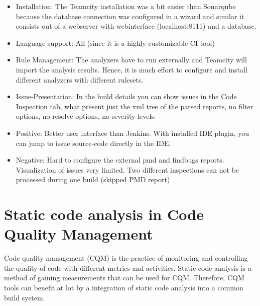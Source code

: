 \documentclass[conference]{IEEEtran}
\begin{document}
\begin{itemize}
	\item Installation: The Teamcity installation was a bit easier than Sonarqube because the database connection was configured in a wizard and similar it consists out of a webserver with webinterface (localhost:8111) and a database.
	
	\item Language support: All (since it is a highly customizable CI tool)
	
	\item Rule Management: The analyzers have to run externally and Teamcity will import the analysis results.
	Hence, it is much effort to configure and install different analyzers with different rulesets.
	
	\item Issue-Presentation: In the build details you can show issues in the Code Inspection tab, what present just the xml tree of the parsed reports, no filter options, no resolve options, no severity levels.
	
	\item Positive: Better user interface than Jenkins. With installed IDE plugin, you can jump to issue source-code directly in the IDE. 
	
	\item Negative: Hard to configure the external pmd and findbugs reports. Visualization of issues very limited. Two different inspections can not be processed during one build (skipped PMD report)
	
\end{itemize}





\section{Static code analysis in Code Quality Management}
\label{sec:static_code_analysis_code_quality_management}


Code quality management (CQM) is the practice of monitoring and controlling the quality of code with different metrics and activities.
Static code analysis is a method of gaining measurements that can be used for CQM. Therefore, CQM tools can benefit at lot by a integration of static code analysis into a common build system.
\end{document}
